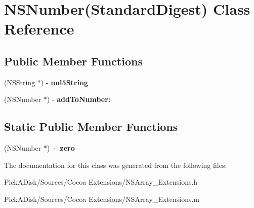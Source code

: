 \hypertarget{interface_n_s_number_07_standard_digest_08}{
\section{NSNumber(StandardDigest) Class Reference}
\label{interface_n_s_number_07_standard_digest_08}
}
\subsection*{Public Member Functions}
\begin{DoxyCompactItemize}
\item 
\hypertarget{interface_n_s_number_07_standard_digest_08_acaac7e082447cce0dee401c09e6af797}{
(\hyperlink{class_n_s_string}{NSString} $\ast$) -\/ {\bfseries md5String}}
\label{interface_n_s_number_07_standard_digest_08_acaac7e082447cce0dee401c09e6af797}

\item 
\hypertarget{interface_n_s_number_07_standard_digest_08_ab328ea133a55622882e821fa1bd9c03e}{
(NSNumber $\ast$) -\/ {\bfseries addToNumber:}}
\label{interface_n_s_number_07_standard_digest_08_ab328ea133a55622882e821fa1bd9c03e}

\end{DoxyCompactItemize}
\subsection*{Static Public Member Functions}
\begin{DoxyCompactItemize}
\item 
\hypertarget{interface_n_s_number_07_standard_digest_08_a5c1bae61b94a259e8d4a8eb6f70cb28d}{
(NSNumber $\ast$) + {\bfseries zero}}
\label{interface_n_s_number_07_standard_digest_08_a5c1bae61b94a259e8d4a8eb6f70cb28d}

\end{DoxyCompactItemize}


The documentation for this class was generated from the following files:\begin{DoxyCompactItemize}
\item 
PickADisk/Sources/Cocoa Extensions/NSArray\_\-Extensions.h\item 
PickADisk/Sources/Cocoa Extensions/NSArray\_\-Extensions.m\end{DoxyCompactItemize}
